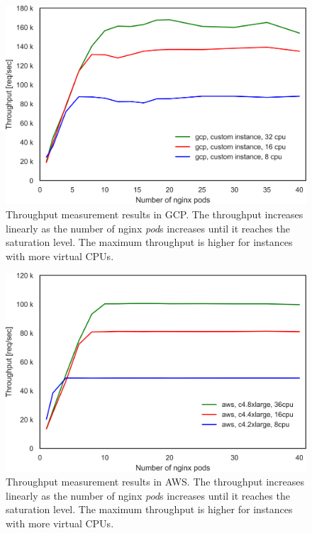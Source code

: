 \begin{figure}[h]
  \centering
  \includegraphics[width=0.75\columnwidth]{Figs/gcp_all_tp}
  \par\bigskip
  \centering
  \begin{minipage}{0.9\columnwidth}
    \caption[Throughput measurement results in GCP]{
Throughput measurement results in GCP.
The throughput increases linearly as the number of nginx {\em pod}s increases until it reaches the saturation level.
The maximum throughput is higher for instances with more virtual CPUs.
    }
    \label{fig:gcp_all_tp}
  \end{minipage}
\end{figure}


\begin{figure}[h]
  \centering
  \includegraphics[width=0.75\columnwidth]{Figs/aws_c4_tp}
  \par\bigskip
  \centering
  \begin{minipage}{0.9\columnwidth}
    \caption[Throughput measurement results in AWS]{
Throughput measurement results in AWS.
The throughput increases linearly as the number of nginx {\em pod}s increases until it reaches the saturation level.
The maximum throughput is higher for instances with more virtual CPUs.
    }
    \label{fig:aws_c4_tp}
  \end{minipage}
\end{figure}

